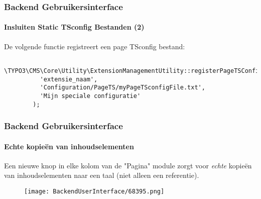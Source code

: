 \begin{frame}[fragile]
	\frametitle{Backend Gebruikersinterface}
	\framesubtitle{Insluiten Static TSconfig Bestanden (2)}

	\lstset{basicstyle=\tiny\ttfamily}

	De volgende functie registreert een page TSconfig bestand:

	\begin{lstlisting}
		\TYPO3\CMS\Core\Utility\ExtensionManagementUtility::registerPageTSConfigFile(
		  'extensie_naam',
		  'Configuration/PageTS/myPageTSconfigFile.txt',
		  'Mijn speciale configuratie'
		);
	\end{lstlisting}

\end{frame}

\begin{frame}[fragile]
	\frametitle{Backend Gebruikersinterface}
	\framesubtitle{Echte kopieën van inhoudselementen}

	Een nieuwe knop in elke kolom van de "Pagina" module zorgt voor \textit{echte} kopieën van inhoudselementen
	naar een taal (niet alleen een referentie).

	\begin{figure}
		\texttt{[image: BackendUserInterface/68395.png]}
	\end{figure}

\end{frame}


